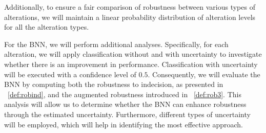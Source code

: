 Additionally, to ensure a fair comparison of robustness between various types of alterations, we will maintain a linear probability distribution of alteration levels for all the alteration types.

For the BNN, we will perform additional analyses. Specifically, for each alteration, we will apply classification without and with uncertainty to investigate whether there is an improvement in performance. Classification with uncertainty will be executed with a confidence level of $0.5$. Consequently, we will evaluate the BNN by computing both the robustness to indecision, as presented in \Def~\ref{def:robind}, and the augmented robustness introduced in \Def~\ref{def:rob3}. This analysis will allow us to determine whether the BNN can enhance robustness through the estimated uncertainty. Furthermore, different types of uncertainty will be employed, which will help in identifying the most effective approach.